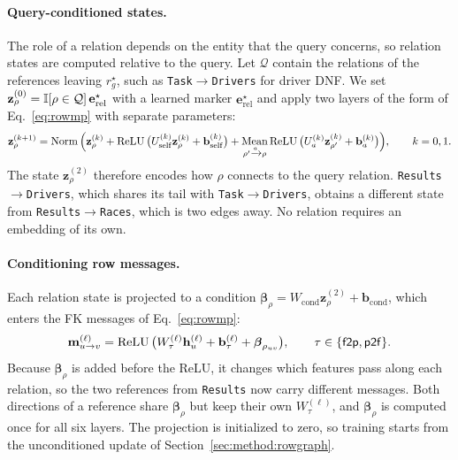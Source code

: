 \paragraph{Query-conditioned states.}
The role of a relation depends on the entity that the query concerns, so
relation states are computed relative to the query. Let $\mathcal Q$ contain
the relations of the references leaving $r_g^\star$, such as
\texttt{Task}$\rightarrow$\texttt{Drivers} for driver DNF. We set
$\mathbf z_\rho^{(0)}=\mathbb{I}[\rho\in\mathcal Q]\,\mathbf e^\star_{\mathrm{rel}}$
with a learned marker $\mathbf e^\star_{\mathrm{rel}}$ and apply two layers of
the form of Eq.~\eqref{eq:rowmp} with separate parameters:
\begin{equation}
 \mathbf z_\rho^{(k+1)}=\operatorname{Norm}\Big(
 \mathbf z_\rho^{(k)}
 +\operatorname{ReLU}\big(U_{\mathrm{self}}^{(k)}\mathbf z_\rho^{(k)}+\mathbf b_{\mathrm{self}}^{(k)}\big)
 +\operatorname*{Mean}_{\rho'\xrightarrow{a}\rho}
 \operatorname{ReLU}\big(U_a^{(k)}\mathbf z_{\rho'}^{(k)}+\mathbf b_a^{(k)}\big)\Big),
 \qquad k=0,1.
 \label{eq:relmp}
\end{equation}
The state $\mathbf z_\rho^{(2)}$ therefore encodes how $\rho$ connects to the
query relation. \texttt{Results}$\rightarrow$\texttt{Drivers}, which shares
its tail with \texttt{Task}$\rightarrow$\texttt{Drivers}, obtains a different
state from \texttt{Results}$\rightarrow$\texttt{Races}, which is two edges
away. No relation requires an embedding of its own.

\paragraph{Conditioning row messages.}
Each relation state is projected to a condition
$\boldsymbol\beta_\rho=W_{\mathrm{cond}}\mathbf z_\rho^{(2)}+\mathbf b_{\mathrm{cond}}$,
which enters the FK messages of Eq.~\eqref{eq:rowmp}:
\begin{equation}
 \mathbf m_{u\to v}^{(\ell)}=\operatorname{ReLU}\big(W_\tau^{(\ell)}\mathbf h_u^{(\ell)}+\mathbf b_\tau^{(\ell)}
 +\boldsymbol\beta_{\rho_{uv}}\big),
 \qquad \tau\in\{\mathsf{f2p},\mathsf{p2f}\}.
 \label{eq:condmsg}
\end{equation}
Because $\boldsymbol\beta_\rho$ is added before the ReLU, it changes which
features pass along each relation, so the two references from
\texttt{Results} now carry different messages. Both directions of a
reference share $\boldsymbol\beta_\rho$ but keep their own $W_\tau^{(\ell)}$,
and $\boldsymbol\beta_\rho$ is computed once for all six layers.
The projection is initialized to zero,
so training starts from the unconditioned update of
Section~\ref{sec:method:rowgraph}.

